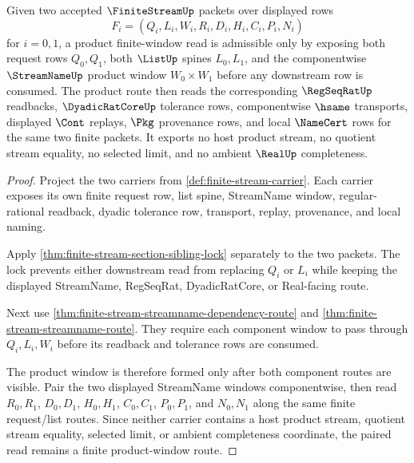 \begin{theorem}
\label{thm:finite-stream-product-window}
Given two accepted $\FiniteStreamUp$ packets over displayed rows
$$
F_i=(Q_i,L_i,W_i,R_i,D_i,H_i,C_i,P_i,N_i)
$$
for $i=0,1$, a product finite-window read is admissible only by exposing both request rows $Q_0,Q_1$, both $\ListUp$ spines $L_0,L_1$, and the componentwise $\StreamNameUp$ product window $W_0 \times W_1$ before any downstream row is consumed. The product route then reads the corresponding $\RegSeqRatUp$ readbacks, $\DyadicRatCoreUp$ tolerance rows, componentwise $\hsame$ transports, displayed $\Cont$ replays, $\Pkg$ provenance rows, and local $\NameCert$ rows for the same two finite packets. It exports no host product stream, no quotient stream equality, no selected limit, and no ambient $\RealUp$ completeness.
\end{theorem}
\begin{proof}
Project the two carriers from \autoref{def:finite-stream-carrier}. Each carrier exposes its own finite request row, list spine, StreamName window, regular-rational readback, dyadic tolerance row, transport, replay, provenance, and local naming.

Apply \autoref{thm:finite-stream-section-sibling-lock} separately to the two packets. The lock prevents either downstream read from replacing $Q_i$ or $L_i$ while keeping the displayed StreamName, RegSeqRat, DyadicRatCore, or Real-facing route.

Next use \autoref{thm:finite-stream-streamname-dependency-route} and \autoref{thm:finite-stream-streamname-route}. They require each component window to pass through $Q_i,L_i,W_i$ before its readback and tolerance rows are consumed.

The product window is therefore formed only after both component routes are visible. Pair the two displayed StreamName windows componentwise, then read $R_0,R_1$, $D_0,D_1$, $H_0,H_1$, $C_0,C_1$, $P_0,P_1$, and $N_0,N_1$ along the same finite request/list routes. Since neither carrier contains a host product stream, quotient stream equality, selected limit, or ambient completeness coordinate, the paired read remains a finite product-window route.
\end{proof}

